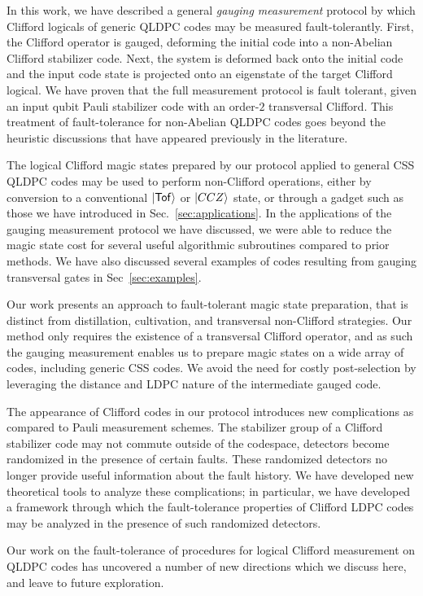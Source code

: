 In this work, we have described a general \emph{gauging measurement} protocol by which Clifford logicals of generic QLDPC codes may be measured fault-tolerantly. First, the Clifford operator is gauged, deforming the initial code into a non-Abelian Clifford stabilizer code. Next, the system is deformed back onto the initial code and the input code state is projected onto an eigenstate of the target Clifford logical. We have proven that the full measurement protocol is fault tolerant, given an input qubit Pauli stabilizer code with an order-$2$ transversal Clifford. This treatment of fault-tolerance for non-Abelian QLDPC codes goes beyond the heuristic discussions that have appeared previously in the literature. 

The logical Clifford magic states prepared by our protocol applied to general CSS QLDPC codes may be used to perform non-Clifford operations, either by conversion to a conventional $\ket{\mathsf{Tof}}$ or $\ket{CCZ}$ state, or through a gadget such as those we have introduced in Sec.~\ref{sec:applications}. In the applications of the gauging measurement protocol we have discussed, we were able to reduce the magic state cost for several useful algorithmic subroutines compared to prior methods. We have also discussed several examples of codes resulting from gauging transversal gates in Sec~\ref{sec:examples}.

Our work presents an approach to fault-tolerant magic state preparation, that is distinct from distillation, cultivation, and transversal non-Clifford strategies. Our method only requires the existence of a transversal Clifford operator, and as such the gauging measurement enables us to prepare magic states on a wide array of codes, including generic CSS codes. We avoid the need for costly post-selection by leveraging the distance and LDPC nature of the intermediate gauged code. 

The appearance of Clifford codes in our protocol introduces new complications as compared to Pauli measurement schemes. The stabilizer group of a Clifford stabilizer code may not commute outside of the codespace, detectors become randomized in the presence of certain faults. These randomized detectors no longer provide useful information about the fault history. We have developed new theoretical tools to analyze these complications; in particular, we have developed a framework through which the fault-tolerance properties of Clifford LDPC codes may be analyzed in the presence of such randomized detectors.

Our work on the fault-tolerance of procedures for logical Clifford measurement on QLDPC codes has uncovered a number of new directions which we discuss here, and leave to future exploration. 

